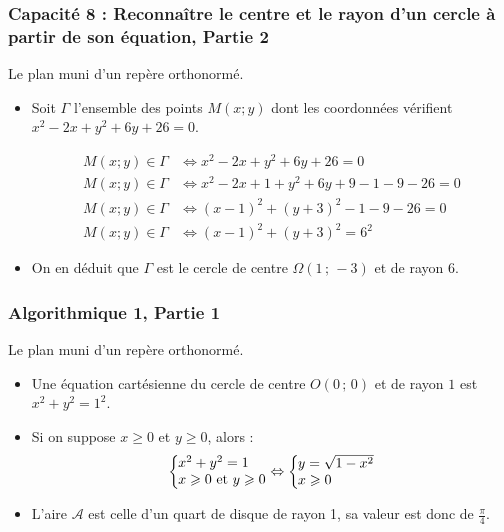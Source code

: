 \documentclass[11pt, hyperref={urlcolor=red,%
            linkcolor=blue, %
            colorlinks=true}]{beamer}
\newcommand{\Coord}[2]{\left(#1\, ;\, #2\right)}
\newcommand{\sys}[2]{
\left\lbrace
 \begin{array}{l}
  \negthickspace\negthickspace #1\\
  \negthickspace\negthickspace #2\\
 \end{array}
\right.\negthickspace\negthickspace}
\begin{document}
\begin{frame}

\frametitle{Capacité 8 : Reconnaître le centre et le rayon d’un cercle à partir de son équation, Partie 2}
Le plan muni d'un repère orthonormé.

\begin{itemize}
\pause \item Soit $\Gamma$ l'ensemble des points $M(x;y)$ dont les coordonnées vérifient $x^{2}-2x+y^{2}+6y+26=0$.   


\begin{align*}
M(x;y) \in \Gamma  &\Leftrightarrow x^{2}-2x+y^{2}+6y+26=0 \\
M(x;y) \in \Gamma  &\Leftrightarrow x^{2}-2x+1+y^{2}+6y+9-1-9-26=0 \\
M(x;y) \in \Gamma  &\Leftrightarrow (x-1)^{2}+(y+3)^{2}-1-9-26=0 \\
M(x;y) \in \Gamma  &\Leftrightarrow (x-1)^{2}+(y+3)^{2}=6^{2}
\end{align*}

\pause \item On en déduit que $\Gamma$ est le cercle de centre $\Omega\Coord{1}{-3}$ et de rayon $6$.
\end{itemize}
\end{frame}


\begin{frame}
\label{algorithmique1}
\frametitle{Algorithmique 1, Partie 1}
Le plan muni d'un repère orthonormé.

\begin{itemize}
\pause \item Une équation cartésienne du cercle de centre $O\Coord{0}{0}$ et de rayon $1$ est $x^{2}+y^{2}=1^{2}$.
\pause \item Si on suppose $x \geqslant 0$ et $y \geqslant 0$, alors : 
$$\sys{x^2+y^2 =1}{x \geqslant 0 \text{ et } y \geqslant 0} \Leftrightarrow \sys{y= \sqrt{1-x^{2}}}{x \geqslant 0}$$
\pause \item L'aire $\mathcal{A}$ est celle d'un quart de disque de rayon 1, sa valeur est donc de $\frac{\pi}{4}$.
\end{itemize}
\end{frame}
\end{document}
